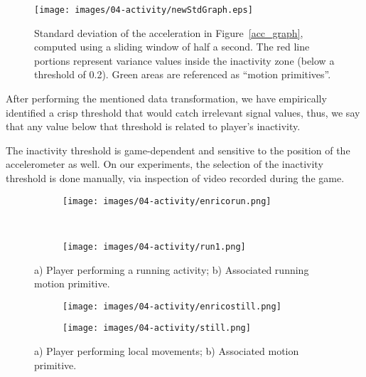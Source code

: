 \begin{figure}[H]
      \centering
      \texttt{[image: images/04-activity/newStdGraph.eps]}
      \caption{Standard deviation of the acceleration in Figure~\ref{acc_graph}, computed using a sliding window of half a second. The red line portions represent variance values inside the inactivity zone (below a threshold of 0.2). Green areas are referenced as ``motion primitives''.}\label{fig:std_graph}
\end{figure}

After performing the mentioned data transformation, we have empirically identified a crisp threshold that would catch irrelevant signal values, thus, we say that any value below that threshold is related to player's inactivity.

The inactivity threshold is game-dependent and sensitive to the position of the accelerometer as well. On our experiments, the selection of the inactivity threshold is done manually, via inspection of video recorded during the game.

\begin{figure}[H]
    \centering
    \begin{subfigure}[b]{0.3\textwidth}
     	\centering
        \texttt{[image: images/04-activity/enricorun.png]}
        \caption{}
	\end{subfigure}
	~
    \begin{subfigure}[b]{0.3\textwidth}
     	\centering
        \texttt{[image: images/04-activity/run1.png]}
        \caption{}
	\end{subfigure}
	\caption{a) Player performing a running activity;  b) Associated running motion primitive.}\label{fig:running}
\end{figure}

\begin{figure}[H]
  \centering
  \begin{subfigure}[b]{0.3\textwidth}
  	 \centering
      \texttt{[image: images/04-activity/enricostill.png]}
      \caption{}
  \end{subfigure}
  \begin{subfigure}[b]{0.3\textwidth}
  	 \centering
      \texttt{[image: images/04-activity/still.png]}
      \caption{}
  \end{subfigure}
  \caption{a) Player performing local movements; b) Associated motion primitive.}    
  \label{fig:localmov}
\end{figure}
    
